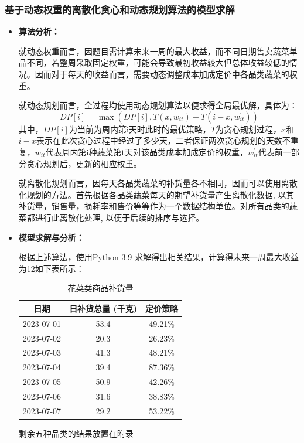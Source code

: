 \documentclass{my_paper}
\begin{document}
\subsubsection{基于动态权重的离散化贪心和动态规划算法的模型求解}
\begin{itemize}
    \item \textbf{算法分析：}\par
    \hspace{2em}就动态权重而言，因题目需计算未来一周的最大收益，而不同日期售卖蔬菜单品不同，若整周采取固定权重，可能会导致最初收益较大但总体收益较低的情况。因而对于每天的收益而言，需要动态调整成本加成定价中各品类蔬菜的权重。\par
    \hspace{2em}就动态规划而言，全过程均使用动态规划算法以便求得全局最优解，具体为：
\begin{equation}
    DP[i]=\max \left(DP[i], T(x, w_{it})+T\left(i-x, w_{it}^{\prime}\right)\right)
\end{equation}
\hspace{2em}其中，$DP[i]$为当前为周内第i天时此时的最优策略，$T$为贪心规划过程，$x$和$i-x$表示在此次贪心过程中经过了多少天，二者保证两次贪心规划的天数不重复，$w_{it}$代表周内第i种蔬菜第t天对该品类成本加成定价的权重，$w_{it}^{\prime}$代表前一部分贪心规划后，更新的相应权重。\par
\hspace{2em}就离散化规划而言，因每天各品类蔬菜的补货量各不相同，因而可以使用离散化规划的方法。首先根据各品类蔬菜每天的期望补货量产生离散化数据, 以其补货量，销售量，损耗率和售价等等作为一个数据结构单位。对所有品类的蔬菜都进行此离散化处理, 以便于后续的排序与选择。
\item \textbf{模型求解与分析：}\par
\hspace{2em}根据上述算法，使用Python 3.9 求解得出相关结果，计算得未来一周最大收益为12如下表所示：
\begin{table}[H]
    \centering
    \caption{花菜类商品补货量}
\begin{tabular}{ccc}
\hline 日期 &  日补货总量 (千克) & 定价策略 \\
\hline 2023-07-01 & 53.4 & 49.21\% \\
2023-07-02 & 20.3 & 26.23\% \\
2023-07-03 & 41.3 & 48.21\% \\
2023-07-04 & 39.4 & 87.36\% \\
2023-07-05 & 50.9 & 42.26\% \\
2023-07-06 & 31.6 & 38.83\% \\
2023-07-07 & 29.2 & 53.22\% \\
\hline
\end{tabular}
\end{table}
剩余五种品类的结果放置在附录
\end{itemize}
\end{document}

